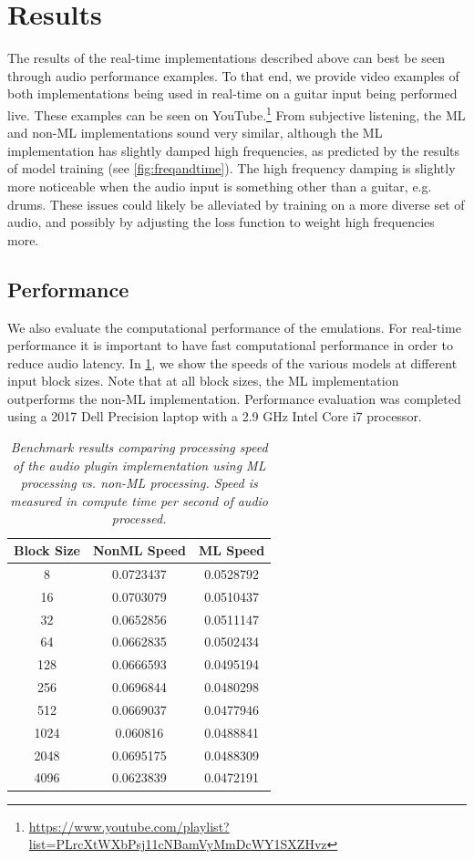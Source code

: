 \documentclass[twoside,a4paper]{article}
\begin{document}
\section{Results}
The results of the real-time implementations described above can best
be seen through audio performance examples. To that end, we provide
video examples of both implementations being used in real-time on a
guitar input being performed live. These examples can be seen on
YouTube.\footnote{\url{https://www.youtube.com/playlist?list=PLrcXtWXbPsj11cNBamVyMmDcWY1SXZHvz}}
From subjective listening, the ML and non-ML implementations sound
very similar, although the ML implementation has slightly damped
high frequencies, as predicted by the results of model training
(see \cref{fig:freqandtime}). The high frequency damping is slightly
more noticeable when the audio input is something other than a
guitar, e.g. drums. These issues could likely be alleviated
by training on a more diverse set of audio, and possibly by adjusting
the loss function to weight high frequencies more.

\subsection{Performance}
We also evaluate the computational performance of the emulations.
For real-time performance it is important to have fast computational
performance in order to reduce audio latency. In \cref{table:bench},
we show the speeds of the various models at different input block
sizes. Note that at all block sizes, the ML implementation outperforms
the non-ML implementation. Performance evaluation was completed using a
2017 Dell Precision laptop with a 2.9 GHz Intel Core i7 processor.
%
\begin{table}[h!]
    \centering
     \begin{tabular}{||c | c | c||} 
     \hline
     Block Size & NonML Speed & ML Speed \\
     \hline\hline
     8    & 0.0723437 & 0.0528792 \\
     16   & 0.0703079 & 0.0510437 \\
     32   & 0.0652856 & 0.0511147 \\
     64   & 0.0662835 & 0.0502434 \\
     128  & 0.0666593 & 0.0495194 \\
     256  & 0.0696844 & 0.0480298 \\
     512  & 0.0669037 & 0.0477946 \\
     1024 & 0.060816  & 0.0488841 \\
     2048 & 0.0695175 & 0.0488309 \\
     4096 & 0.0623839 & 0.0472191 \\
     \hline
     \end{tabular}
    \caption{\label{table:bench} {\it Benchmark results
        comparing processing speed of the audio plugin
        implementation using ML processing vs. non-ML
        processing. Speed is measured in compute time per
        second of audio processed.}}
\end{table}
\end{document}
